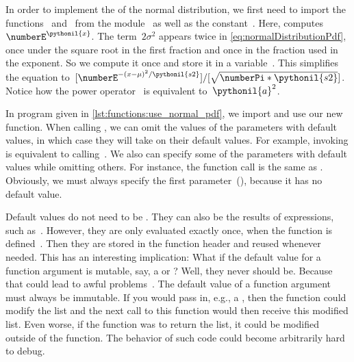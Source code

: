 In order to implement the  of the normal distribution, we first need to import the functions~ and~ from the module~ as well as the constant~.
Here,  computes~$\numberE^{\pythonil{x}}$.
The term~$2\sigma^2$ appears twice in \cref{eq:normalDistributionPdf}, once under the square root in the first fraction and once in the fraction used in the exponent.
So we compute it once and store it in a variable~.
This simplifies the equation to~$[\numberE^{-(x-\mu)^2 / \pythonil{s2}}]/[\sqrt{\numberPi*\pythonil{s2}}]$.
Notice how the power operator~\pythonIdx{**} is equivalent to~$\pythonil{a}^2$.

In program  given in \cref{lst:functions:use_normal_pdf}, we import and use our new  function.
When calling , we can omit the values of the parameters with default values, in which case they will take on their default values.
For example, invoking  is equivalent to calling~.
We also can specify some of the parameters with default values while omitting others.
For instance, the function call  is the same as .
Obviously, we must always specify the first parameter~(), because it has no default value.

Default values do not need to be .
They can also be the results of expressions, such as~.
However, they are only evaluated exactly once, when the function is defined~\cite{H2025PM:MDA}.
Then they are stored in the function header and reused whenever needed.
This has an interesting implication:
What if the default value for a function argument is mutable, say, a  or ?
Well, they never should be.
Because that could lead to awful problems~\cite{H2025PM:MDA}.
%
%
%
The default value of a function argument must always be immutable.
If you would pass in, e.g., a , then the function could modify the list and the next call to this function would then receive this modified list.
Even worse, if the function was to return the list, it could be modified outside of the function.
The behavior of such code could become arbitrarily hard to debug.

